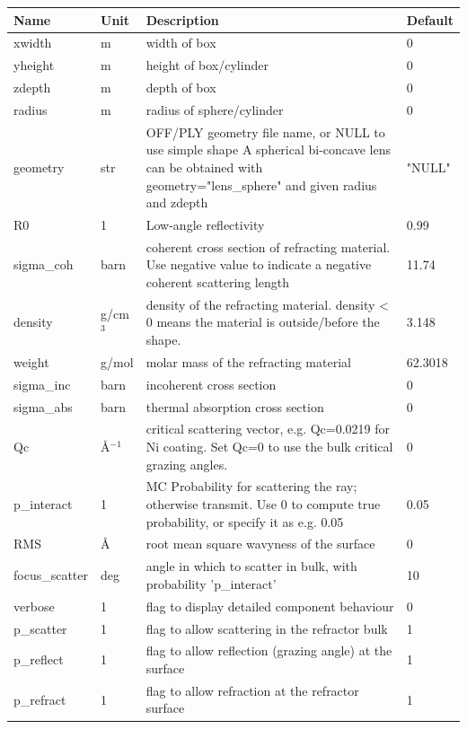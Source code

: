\begin{longtable}{p{}p{}p{}p{}}
\toprule
\textbf{Name} & \textbf{Unit} & \textbf{Description} & \textbf{Default} \\
\midrule
\endhead
xwidth & m & width of box & 0 \\
yheight & m & height of box/cylinder & 0 \\
zdepth & m & depth of box & 0 \\
radius & m & radius of sphere/cylinder & 0 \\
geometry & str & OFF/PLY geometry file name, or NULL to use simple shape A spherical bi-concave lens can be obtained with geometry="lens\_sphere" and given radius and zdepth & "NULL" \\
R0 & 1 & Low-angle reflectivity & 0.99 \\
sigma\_coh & barn & coherent cross section of refracting material. Use negative value to indicate a negative coherent scattering length & 11.74 \\
density & g/cm$^{3}$ & density of the refracting material. density \textless{} 0 means the material is outside/before the shape. & 3.148 \\
weight & g/mol & molar mass of the refracting material & 62.3018 \\
sigma\_inc & barn & incoherent cross section & 0 \\
sigma\_abs & barn & thermal absorption cross section & 0 \\
Qc & \AA{}$^{-1}$ & critical scattering vector, e.g. Qc=0.0219 for Ni coating. Set Qc=0 to use the bulk critical grazing angles. & 0 \\
p\_interact & 1 & MC Probability for scattering the ray; otherwise transmit. Use 0 to compute true probability, or specify it as e.g. 0.05 & 0.05 \\
RMS & \AA{} & root mean square wavyness of the surface & 0 \\
focus\_scatter & deg & angle in which to scatter in bulk, with probability 'p\_interact' & 10 \\
verbose & 1 & flag to display detailed component behaviour & 0 \\
p\_scatter & 1 & flag to allow scattering in the refractor bulk & 1 \\
p\_reflect & 1 & flag to allow reflection (grazing angle) at the surface & 1 \\
p\_refract & 1 & flag to allow refraction at the refractor surface & 1 \\
\bottomrule
\end{longtable}

